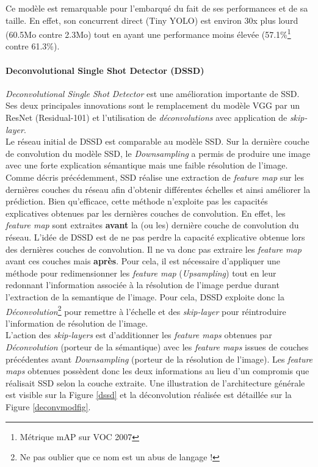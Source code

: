 \noindent Ce modèle est remarquable pour l'embarqué du fait de ses performances et de sa taille. En effet, son concurrent direct (Tiny YOLO) est environ 30x plus lourd (60.5Mo contre 2.3Mo) tout en ayant une performance moins élevée (57.1\%\footnote{Métrique mAP sur VOC 2007} contre 61.3\%).

\paragraph{Deconvolutional Single Shot Detector (DSSD)}
\textit{Deconvolutional Single Shot Detector}\cite{dssd} est une amélioration importante de SSD. Ses deux principales innovations sont le remplacement du modèle VGG par un ResNet (Residual-101) et l'utilisation de \textit{déconvolutions} avec application de \textit{skip-layer}.\\

\noindent Le réseau initial de DSSD est comparable au modèle SSD. Sur la dernière couche de convolution du modèle SSD, le \textit{Downsampling} a permis de produire une image avec une forte explication sémantique mais une faible résolution de l'image. Comme décris précédemment, SSD réalise une extraction de \textit{feature map} sur les dernières couches du réseau afin d'obtenir différentes échelles et ainsi améliorer la prédiction. Bien qu'efficace, cette méthode n'exploite pas les capacités explicatives obtenues par les dernières couches de convolution. En effet, les \textit{feature map} sont extraites \textbf{avant} la (ou les) dernière couche de convolution du réseau. L'idée de DSSD est de ne pas perdre la capacité explicative obtenue lors des dernières couches de convolution. Il ne va donc pas extraire les \textit{feature map} avant ces couches mais \textbf{après}. Pour cela, il est nécessaire d'appliquer une méthode pour redimensionner les \textit{feature map} (\textit{Upsampling}) tout en leur redonnant l'information associée à la résolution de l'image perdue durant l'extraction de la semantique de l'image. Pour cela, DSSD exploite donc la \textit{Déconvolution}\footnote{Ne pas oublier que ce nom est un abus de langage !} pour remettre à l'échelle et des \textit{skip-layer} pour réintroduire l'information de résolution de l'image.\\

\noindent L'action des \textit{skip-layers} est d'additionner les \textit{feature maps} obtenues par \textit{Déconvolution} (porteur de la sémantique) avec les \textit{feature maps} issues de couches précédentes avant \textit{Downsampling} (porteur de la résolution de l'image). Les \textit{feature maps} obtenues possèdent donc les deux informations au lieu d'un compromis que réalisait SSD selon la couche extraite. Une illustration de l'architecture générale est visible sur la Figure \ref{dssd} et la déconvolution réalisée est détaillée sur la Figure \ref{deconvmodfig}.\\

